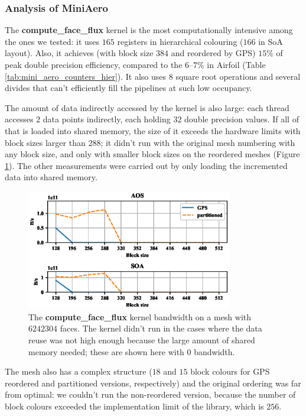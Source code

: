 \subsubsection{Analysis of MiniAero}

The \textbf{compute\_face\_flux} kernel is the most computationally intensive
among the ones we tested: it uses $165$ registers in hierarchical  colouring
($166$ in SoA layout). Also, it achieves (with block size $384$ and reordered by
GPS) $15\%$ of peak double precision efficiency, compared to the $6$--$7\%$ in
Airfoil (Table \ref{tab:mini_aero_counters_hier}). It also uses $8$ square root
operations and several divides that can't efficiently fill the pipelines at such
low occupancy.

The amount of data indirectly accessed by the kernel is also large: each thread
accesses $2$ data points indirectly, each holding $32$ double precision values.
If all of that is loaded into shared memory, the size of it exceeds the hardware
limits with block sizes larger than $288$; it didn't run with the original mesh
numbering with any block size, and only with smaller block sizes on the reordered meshes (Figure \ref{fig:mini_aero_bw_crash}). The other measurements were carried out
by only loading the incremented data into shared memory.

\begin{figure}[Htbp]
  \centering
  \includegraphics[width=9cm]{fig/mini_aero_bw_crash.eps}
  \caption{The \textbf{compute\_face\_flux} kernel bandwidth on a mesh with
  $6242304$ faces. The kernel didn't run in the cases where the data reuse was
  not high enough because the large amount of shared memory needed; these are
  shown here with $0$ bandwidth.}
  \label{fig:mini_aero_bw_crash}
\end{figure}

The mesh also has a complex structure ($18$ and $15$ block colours for GPS
reordered and partitioned versions, respectively) and the original ordering was
far from optimal: we couldn't run the non-reordered version, because the number
of block colours exceeded the implementation limit of the library, which is
$256$.

